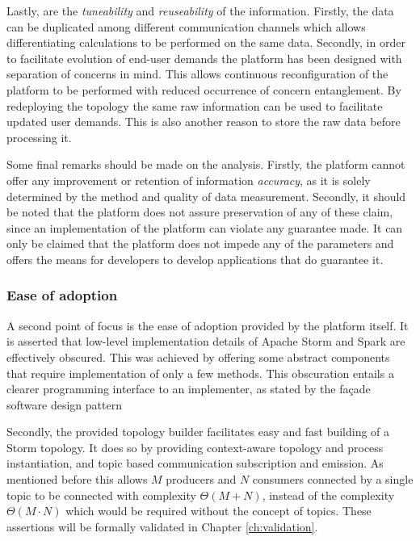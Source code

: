 Lastly, are the \emph{tuneability} and \emph{reuseability} of the information. Firstly, the data can be duplicated among different communication channels which allows differentiating calculations to be performed on the same data. Secondly, in order to facilitate evolution of end-user demands the platform has been designed with separation of concerns in mind. This allows continuous reconfiguration of the platform to be performed with reduced occurrence of concern entanglement. By redeploying the topology the same raw information can be used to facilitate updated user demands. This is also another reason to store the raw data before processing it.

Some final remarks should be made on the analysis. Firstly, the platform cannot offer any improvement or retention of information \emph{accuracy}, as it is solely determined by the method and quality of data measurement. Secondly, it should be noted that the platform does not assure preservation of any of these claim, since an implementation of the platform can violate any guarantee made. It can only be claimed that the platform does not impede any of the parameters and offers the means for developers to develop applications that do guarantee it.

\subsubsection*{Ease of adoption}
A second point of focus is the ease of adoption provided by the platform itself. It is asserted that low-level implementation details of Apache Storm and Spark are effectively obscured. This was achieved by offering some abstract components that require implementation of only a few methods. This obscuration entails a clearer programming interface to an implementer, as stated by the fa\c{c}ade software design pattern \cite{facade_pattern}

Secondly, the provided topology builder facilitates easy and fast building of a Storm topology. It does so by providing context-aware topology and process instantiation, and topic based communication subscription and emission.  As mentioned before this allows $M$ producers and $N$ consumers connected by a single topic to be connected with complexity $\Theta(M+N)$, instead of the complexity $\Theta(M\cdot N)$ which would be required without the concept of topics. These assertions will be formally validated in Chapter \ref{ch:validation}.

